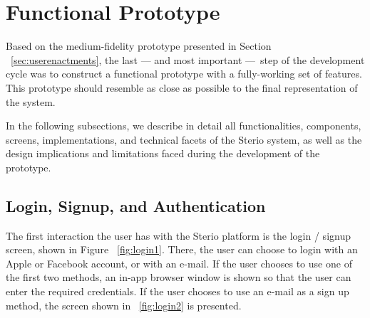 
\section{Functional Prototype}

Based on the medium-fidelity prototype presented in Section ~\ref{sec:userenactments}, the last — and most important — step of the development cycle was to construct a functional prototype with a fully-working set of features. This prototype should resemble as close as possible to the final representation of the system. 

In the following subsections, we describe in detail all functionalities, components, screens, implementations, and technical facets of the Sterio system, as well as the design implications and limitations faced during the development of the prototype. %

\subsection{Login, Signup, and Authentication}
\label{subsec:lsa}

The first interaction the user has with the Sterio platform is the login / signup screen, shown in Figure ~\ref{fig:login1}. There, the user can choose to login with an Apple or Facebook account, or with an e-mail. If the user chooses to use one of the first two methods, an in-app browser window is shown so that the user can enter the required credentials. If the user chooses to use an e-mail as a sign up method, the screen shown in ~\ref{fig:login2} is presented.

